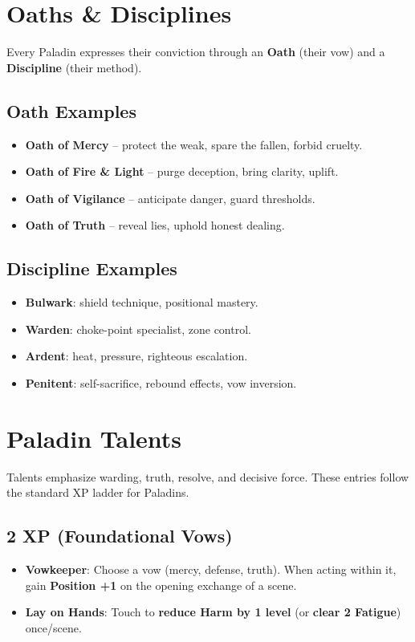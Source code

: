 \documentclass[11pt]{book}
\begin{document}
\section{Oaths \& Disciplines}
Every Paladin expresses their conviction through an \textbf{Oath} (their vow) and a
\textbf{Discipline} (their method).

\subsection{Oath Examples}
\begin{itemize}
  \item \textbf{Oath of Mercy} -- protect the weak, spare the fallen, forbid cruelty.
  \item \textbf{Oath of Fire \& Light} -- purge deception, bring clarity, uplift.
  \item \textbf{Oath of Vigilance} -- anticipate danger, guard thresholds.
  \item \textbf{Oath of Truth} -- reveal lies, uphold honest dealing.
\end{itemize}

\subsection{Discipline Examples}
\begin{itemize}
  \item \textbf{Bulwark}: shield technique, positional mastery.
  \item \textbf{Warden}: choke-point specialist, zone control.
  \item \textbf{Ardent}: heat, pressure, righteous escalation.
  \item \textbf{Penitent}: self-sacrifice, rebound effects, vow inversion.
\end{itemize}

\section{Paladin Talents}
Talents emphasize warding, truth, resolve, and decisive force. These entries follow the
standard XP ladder for Paladins.

\subsection*{2 XP (Foundational Vows)}
\begin{itemize}
  \item \textbf{Vowkeeper}: Choose a vow (mercy, defense, truth). When acting within it,
    gain \textbf{Position +1} on the opening exchange of a scene.
  \item \textbf{Lay on Hands}: Touch to \textbf{reduce Harm by 1 level} (or \textbf{clear
    2 Fatigue}) once/scene.
\end{itemize}
\end{document}
